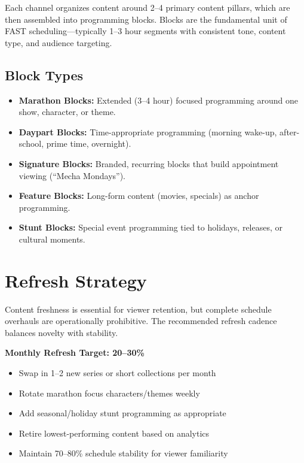 \documentclass[12pt,letterpaper,twoside]{report}
\begin{document}
Each channel organizes content around 2--4 primary content pillars, which are then assembled into programming blocks. Blocks are the fundamental unit of FAST scheduling---typically 1--3 hour segments with consistent tone, content type, and audience targeting.

\subsection{Block Types}

\begin{itemize}[leftmargin=1.5cm]
    \item \textbf{Marathon Blocks:} Extended (3--4 hour) focused programming around one show, character, or theme.
    \item \textbf{Daypart Blocks:} Time-appropriate programming (morning wake-up, after-school, prime time, overnight).
    \item \textbf{Signature Blocks:} Branded, recurring blocks that build appointment viewing (``Mecha Mondays'').
    \item \textbf{Feature Blocks:} Long-form content (movies, specials) as anchor programming.
    \item \textbf{Stunt Blocks:} Special event programming tied to holidays, releases, or cultural moments.
\end{itemize}

\section{Refresh Strategy}

Content freshness is essential for viewer retention, but complete schedule overhauls are operationally prohibitive. The recommended refresh cadence balances novelty with stability.

\begin{strategybox}
\textbf{Monthly Refresh Target: 20--30\%}

\begin{itemize}
    \item Swap in 1--2 new series or short collections per month
    \item Rotate marathon focus characters/themes weekly
    \item Add seasonal/holiday stunt programming as appropriate
    \item Retire lowest-performing content based on analytics
    \item Maintain 70--80\% schedule stability for viewer familiarity
\end{itemize}
\end{strategybox}
\end{document}
